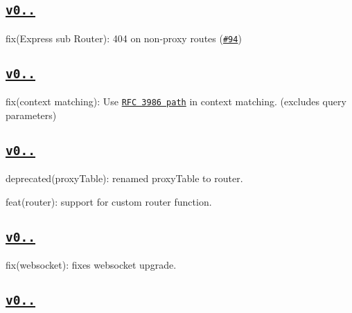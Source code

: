 \subsection*{\href{https://github.com/chimurai/http-proxy-middleware/releases/tag/v0.17.1}{\tt v0..}}


\begin{DoxyItemize}
\item fix(\+Express sub Router)\+: 404 on non-\/proxy routes (\href{https://github.com/chimurai/http-proxy-middleware/issues/94}{\tt \#94})
\end{DoxyItemize}

\subsection*{\href{https://github.com/chimurai/http-proxy-middleware/releases/tag/v0.17.0}{\tt v0..}}


\begin{DoxyItemize}
\item fix(context matching)\+: Use \href{https://tools.ietf.org/html/rfc3986#section-3.3}{\tt R\+FC 3986 path} in context matching. (excludes query parameters)
\end{DoxyItemize}

\subsection*{\href{https://github.com/chimurai/http-proxy-middleware/releases/tag/v0.16.0}{\tt v0..}}


\begin{DoxyItemize}
\item deprecated(proxy\+Table)\+: renamed {\ttfamily proxy\+Table} to {\ttfamily router}.
\item feat(router)\+: support for custom {\ttfamily router} function.
\end{DoxyItemize}

\subsection*{\href{https://github.com/chimurai/http-proxy-middleware/releases/tag/v0.15.2}{\tt v0..}}


\begin{DoxyItemize}
\item fix(websocket)\+: fixes websocket upgrade.
\end{DoxyItemize}

\subsection*{\href{https://github.com/chimurai/http-proxy-middleware/releases/tag/v0.15.1}{\tt v0..}}


